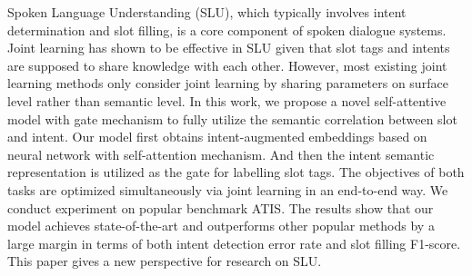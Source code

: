 Spoken Language Understanding (SLU), which typically involves intent determination and slot filling, is a core component of spoken dialogue systems. Joint learning has shown to be effective in SLU given that slot tags and intents are supposed to share knowledge with each other. However, most existing joint learning methods only consider joint learning by sharing parameters on surface level rather than semantic level. In this work, we propose a novel self-attentive model with gate mechanism to fully utilize the semantic correlation between slot and intent. Our model first obtains intent-augmented embeddings based on neural network with self-attention mechanism. And then the intent semantic representation is utilized as the gate for labelling slot tags. The objectives of both tasks are optimized simultaneously via joint learning in an end-to-end way. We conduct experiment on popular benchmark ATIS. The results show that our model achieves state-of-the-art and outperforms other popular methods by a large margin in terms of both intent detection error rate and slot filling F1-score. This paper gives a new perspective for research on SLU.
